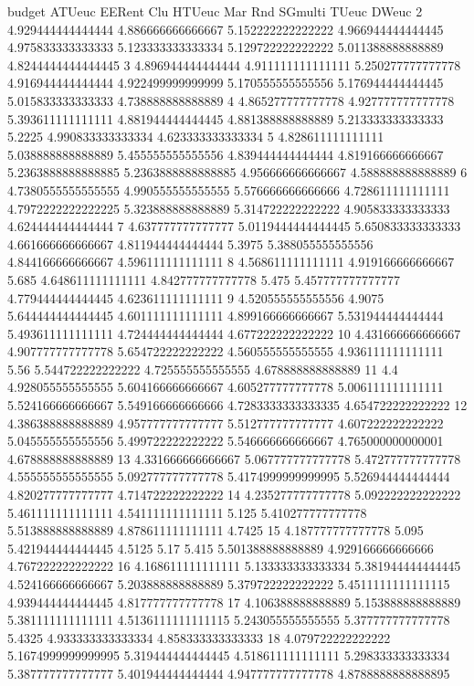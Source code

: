 budget ATUeuc EERent Clu HTUeuc Mar Rnd SGmulti TUeuc DWeuc
2 4.929444444444444 4.886666666666667 5.152222222222222 4.966944444444445 4.975833333333333 5.123333333333334 5.129722222222222 5.011388888888889 4.8244444444444445
3 4.896944444444444 4.911111111111111 5.250277777777778 4.916944444444444 4.922499999999999 5.170555555555556 5.176944444444445 5.015833333333333 4.738888888888889
4 4.865277777777778 4.927777777777778 5.393611111111111 4.881944444444445 4.881388888888889 5.213333333333333 5.2225 4.990833333333334 4.623333333333334
5 4.828611111111111 5.038888888888889 5.455555555555556 4.839444444444444 4.819166666666667 5.2363888888888885 5.2363888888888885 4.956666666666667 4.588888888888889
6 4.7380555555555555 4.990555555555555 5.576666666666666 4.728611111111111 4.7972222222222225 5.323888888888889 5.314722222222222 4.905833333333333 4.624444444444444
7 4.637777777777777 5.0119444444444445 5.650833333333333 4.661666666666667 4.811944444444444 5.3975 5.388055555555556 4.844166666666667 4.596111111111111
8 4.568611111111111 4.919166666666667 5.685 4.648611111111111 4.842777777777778 5.475 5.457777777777777 4.779444444444445 4.623611111111111
9 4.520555555555556 4.9075 5.644444444444445 4.601111111111111 4.899166666666667 5.531944444444444 5.493611111111111 4.724444444444444 4.677222222222222
10 4.431666666666667 4.907777777777778 5.654722222222222 4.560555555555555 4.936111111111111 5.56 5.544722222222222 4.725555555555555 4.678888888888889
11 4.4 4.928055555555555 5.604166666666667 4.605277777777778 5.006111111111111 5.524166666666667 5.549166666666666 4.7283333333333335 4.654722222222222
12 4.386388888888889 4.957777777777777 5.512777777777777 4.607222222222222 5.045555555555556 5.499722222222222 5.546666666666667 4.765000000000001 4.678888888888889
13 4.331666666666667 5.067777777777778 5.472777777777778 4.555555555555555 5.092777777777778 5.4174999999999995 5.526944444444444 4.820277777777777 4.714722222222222
14 4.235277777777778 5.092222222222222 5.461111111111111 4.541111111111111 5.125 5.410277777777778 5.513888888888889 4.878611111111111 4.7425
15 4.187777777777778 5.095 5.421944444444445 4.5125 5.17 5.415 5.501388888888889 4.929166666666666 4.767222222222222
16 4.168611111111111 5.133333333333334 5.381944444444445 4.524166666666667 5.203888888888889 5.379722222222222 5.4511111111111115 4.939444444444445 4.817777777777778
17 4.106388888888889 5.153888888888889 5.381111111111111 4.5136111111111115 5.243055555555555 5.377777777777778 5.4325 4.933333333333334 4.858333333333333
18 4.079722222222222 5.1674999999999995 5.319444444444445 4.518611111111111 5.298333333333334 5.387777777777777 5.401944444444444 4.947777777777778 4.8788888888888895
